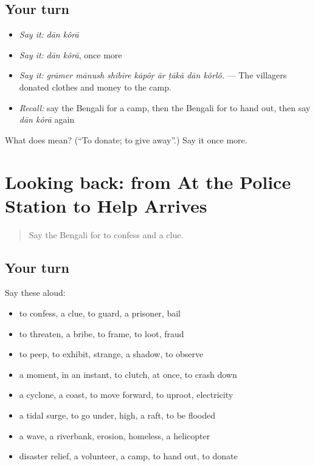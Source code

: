 \subsection*{Your turn}
\begin{itemize}
\raggedright
  \item \emph{Say it:} \emph{dān kôrā}
  \item \emph{Say it:} \emph{dān kôrā}, once more
  \item \emph{Say it:} \emph{grāmer mānush shibire kāpôṛ ār ṭākā dān kôrlô.} — The villagers donated clothes and money to the camp.
  \item \emph{Recall:} say the Bengali for a camp, then the Bengali for to hand out, then say \emph{dān kôrā} again
\end{itemize}

\begin{tcolorbox}[breakable,colback=teal!4,colframe=teal!35!black,title={Before you move on}]
What does   mean? (\textquotedblleft{}To donate; to give away\textquotedblright{}.) Say it once more.
\end{tcolorbox}
\section[(dialogue)]{Looking back: from At the Police Station to Help Arrives}

\label{lesson:BN-R291-review-284-291}



\begin{quote}
Say the Bengali for to confess and a clue.
\end{quote}

\subsection*{Your turn}
Say these aloud:

\begin{itemize}
\raggedright
  \item to confess, a clue, to guard, a prisoner, bail
  \item to threaten, a bribe, to frame, to loot, fraud
  \item to peep, to exhibit, strange, a shadow, to observe
  \item a moment, in an instant, to clutch, at once, to crash down
  \item a cyclone, a coast, to move forward, to uproot, electricity
  \item a tidal surge, to go under, high, a raft, to be flooded
  \item a wave, a riverbank, erosion, homeless, a helicopter
  \item disaster relief, a volunteer, a camp, to hand out, to donate
\end{itemize}

